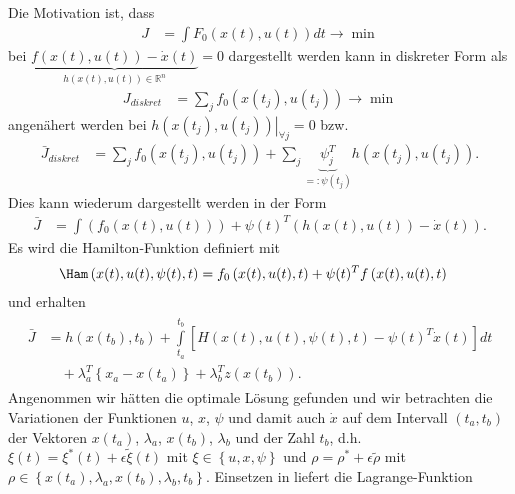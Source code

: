 Die Motivation ist, dass 
\begin{align*}
	J & = \int F_0(x(t),u(t))dt \rightarrow \min
\end{align*}
bei $\underbrace{f\left(x(t), u(t) \right)-\dot{x}(t) }_{h\left(x(t),u(t) \right)\in\mathbb{R}^n }=0$ dargestellt werden kann in diskreter Form als
\begin{align*}
	J_{diskret} & = \sum\limits_j f_0(x(t_j),u(t_j))\rightarrow \min 
\end{align*}
angenähert werden bei $\left. h\left(x(t_j),u(t_j) \right)\right|_{\forall j}=0$ bzw.
\begin{align*}
	\bar{J}_{diskret} & = \sum\limits_j f_0(x(t_j),u(t_j)) + \sum\limits_j \underbrace{\psi_j^T}_{=:\psi(t_j)} h\left(x(t_j),u(t_j) \right).
\end{align*}
Dies kann wiederum dargestellt werden in der Form
\begin{align*}
	\bar{J} & = \int\left(f_0(x(t),u(t)) \right) + \psi(t)^T\left(h(x(t),u(t))-\dot{x}(t) \right).
\end{align*}
Es wird die Hamilton-Funktion definiert mit
\begin{align*}
	\Ham\left(x(t),u(t),\psi(t),t \right) & = f_0\left(x(t),u(t),t \right) + \psi(t)^T f\left(x(t),u(t),t \right)
\end{align*}
und erhalten 
\begin{align}
	\begin{split}\label{eqn:kap_2_lagrange_fun}
		\bar{J} & = h\left(x(t_b),t_b \right) + \int\limits_{t_a}^{t_b}\left[H\left(x(t),u(t),\psi(t),t \right)-\psi(t)^T\dot{x}(t) \right]dt\\
				& \quad +\lambda_a^T\left\{x_a-x(t_a) \right\} + \lambda_b^T z\left(x(t_b)\right).
	\end{split}
\end{align}
Angenommen wir hätten die optimale Lösung gefunden und wir betrachten die Variationen der Funktionen $u$, $x$, $\psi$ und damit auch $\dot{x}$ auf dem
Intervall $\left(t_a, t_b \right)$ der Vektoren $x(t_a)$, $\lambda_a$, $x(t_b)$, $\lambda_b$ und der Zahl $t_b$, d.h.
$\xi(t)=\xi^{\ast}(t)+\epsilon\tilde{\xi}(t)$ mit $\xi\in \left\{u,x,\psi\right\}$ und $\rho=\rho^{\ast} + \epsilon \tilde{\rho}$ mit $\rho \in \left\{x(t_a),\lambda_a, x(t_b), \lambda_b, t_b\right\}$. Einsetzen in
 liefert die Lagrange-Funktion
